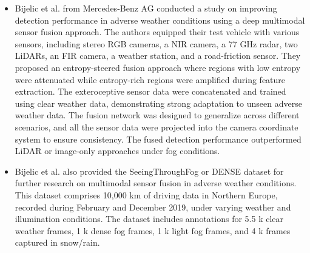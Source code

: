 \documentclass[rnd]{mas_proposal}
\begin{document}
\begin{itemize}
      \item Bijelic et al. \cite{bijelic2020seeing} from Mercedes-Benz AG conducted a study on improving detection performance in adverse weather conditions using a deep multimodal sensor fusion approach. The authors equipped their test vehicle with various sensors, including stereo RGB cameras, a NIR camera, a 77 GHz radar, two LiDARs, an FIR camera, a weather station, and a road-friction sensor. They proposed an entropy-steered fusion approach where regions with low entropy were attenuated while entropy-rich regions were amplified during feature extraction. The exteroceptive sensor data were concatenated and trained using clear weather data, demonstrating strong adaptation to unseen adverse weather data. The fusion network was designed to generalize across different scenarios, and all the sensor data were projected into the camera coordinate system to ensure consistency. The fused detection performance outperformed LiDAR or image-only approaches under fog conditions.
      \item Bijelic et al. \cite{bijelic2020seeing} also provided the SeeingThroughFog or DENSE dataset for further research on multimodal sensor fusion in adverse weather conditions. This dataset comprises 10,000 km of driving data in Northern Europe, recorded during February and December 2019, under varying weather and illumination conditions. The dataset includes annotations for 5.5 k clear weather frames, 1 k dense fog frames, 1 k light fog frames, and 4 k frames captured in snow/rain.


\end{itemize}
\end{document}
